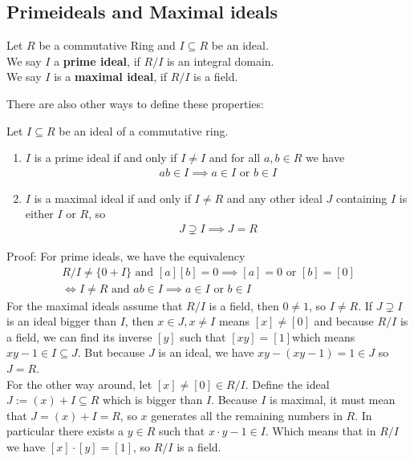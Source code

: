 \subsection{Primeideals and Maximal ideals}

\begin{definition}
	Let $R$ be a commutative Ring and $I \subseteq R$ be an ideal.\\
	We say $I$ a \textbf{prime ideal}, if $R/I$ is an integral domain.\\
	We say $I$ is a \textbf{maximal ideal}, if $R/I$ is a field.
\end{definition}
There are also other ways to define these properties:
\begin{proposition}[]
	Let $I \subseteq R$ be an ideal of a commutative ring.\\
	\begin{enumerate}
	\item 	$I$ is a prime ideal if and only if $I \neq I$ and for all $a,b \in R$ we have 
		\begin{align*}
			ab \in I \implies a \in I \text{ or } b \in I
		\end{align*}
	\item 	$I$ is a maximal ideal if and only if $I \neq R$ and any other ideal $J$ containing $I$ is either $I$ or $R$, so 
		\begin{align*}
			J \supsetneq I \implies J = R
		\end{align*}
	\end{enumerate}
\end{proposition}
Proof: For prime ideals, we have the equivalency
\begin{align*}
	R/I \neq \{0 + I\} \text{ and } [a][b] = 0 \implies [a] = 0 \text{ or } [b] = [0]\\
		\iff I \neq R \text{ and } ab \in I \implies a \in I \text{ or } b \in I
\end{align*}
For the maximal ideals assume that $R/I$ is a field, then $0 \neq 1$, so $I \neq R$.
If $J \supsetneq I$ is an ideal bigger than $I$, then $x \in J, x \neq I$ means $[x] \neq [0]$ and because $R/I$ is a field, we can find its inverse $[y]$ such that $[xy] = [1]$which means $xy - 1 \in I \subseteq J$. But because $J$ is an ideal, we have $xy - (xy - 1) = 1 \in J$ so $J = R$.\\

For the other way around, let $[x] \neq [0] \in R/I$. Define the ideal $J:= (x) + I \subseteq R$ which is bigger than $I$. Because $I$ is maximal, it must mean that $J = (x) + I = R$, so $x$ generates all the remaining numbers in $R$. In particular there exists a $y \in R$ such that $x \cdot y - 1 \in I$. Which means that in $R/I$ we have $[x] \cdot [y] = [1]$, so $R/I$ is a field.\\


